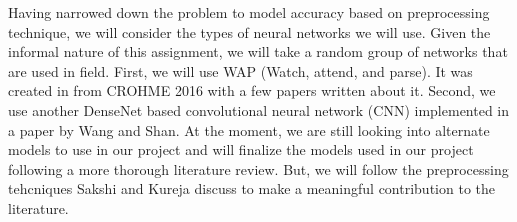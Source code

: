 \documentclass[../proposal.tex]{subfiles}
\begin{document}
\indent Having narrowed down the problem to model accuracy based on preprocessing technique, we will consider the types of neural networks we will use. Given the informal nature of this assignment, we will take a random group of networks that are used in field. First, we will use WAP (Watch, attend, and parse). It was created in from CROHME 2016 with a few papers written about it.\cite{zhang_2017_watch} \cite{zhang_2018_multi} Second, we use another DenseNet based convolutional neural network (CNN) implemented in a paper by Wang and Shan. \cite{Wang_2020_recognizing} At the moment, we are still looking into alternate models to use in our project and will finalize the models used in our project following a more thorough literature review. But, we will follow the preprocessing tehcniques Sakshi and Kureja discuss to make a meaningful contribution to the literature.
\end{document}
